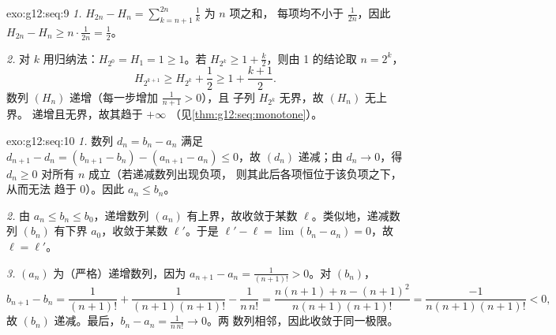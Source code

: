 \begin{solution}{exo:g12:seq:9}
\emph{1.} $H_{2n} - H_n = \sum_{k=n+1}^{2n} \frac{1}{k}$ 为 $n$ 项之和，
每项均不小于 $\frac{1}{2n}$，因此
$H_{2n} - H_n \geq n \cdot \frac{1}{2n} = \frac12$。

\emph{2.} 对 $k$ 用归纳法：$H_{2^0} = H_1 = 1 \geq 1$。若
$H_{2^k} \geq 1 + \frac{k}{2}$，则由 1 的结论取 $n = 2^k$，
\[
H_{2^{k+1}} \geq H_{2^k} + \frac12 \geq 1 + \frac{k+1}{2}.
\]
数列 $(H_n)$ 递增（每一步增加 $\frac{1}{n+1} > 0$），且
子列 $H_{2^k}$ 无界，故 $(H_n)$ 无上界。
递增且无界，故其趋于 $+\infty$
（见\cref{thm:g12:seq:monotone}）。
\end{solution}

\begin{solution}{exo:g12:seq:10}
\emph{1.} 数列 $d_n = b_n - a_n$ 满足
$d_{n+1} - d_n = (b_{n+1} - b_n) - (a_{n+1} - a_n) \leq 0$，故 $(d_n)$
递减；由 $d_n \to 0$，得 $d_n \geq 0$ 对所有 $n$ 成立（若递减数列出现负项，
则其此后各项恒位于该负项之下，从而无法
趋于 $0$）。因此 $a_n \leq b_n$。

\emph{2.} 由 $a_n \leq b_n \leq b_0$，递增数列 $(a_n)$
有上界，故收敛于某数 $\ell$。类似地，递减数列 $(b_n)$
有下界 $a_0$，收敛于某数 $\ell'$。于是
$\ell' - \ell = \lim (b_n - a_n) = 0$，故 $\ell = \ell'$。

\emph{3.} $(a_n)$ 为（严格）递增数列，因为
$a_{n+1} - a_n = \frac{1}{(n+1)!} > 0$。对 $(b_n)$，
\[
b_{n+1} - b_n = \frac{1}{(n+1)!} + \frac{1}{(n+1)(n+1)!} - \frac{1}{n\,n!}
= \frac{n(n+1) + n - (n+1)^2}{n(n+1)(n+1)!}
= \frac{-1}{n(n+1)(n+1)!} < 0 ,
\]
故 $(b_n)$ 递减。最后，$b_n - a_n = \frac{1}{n\,n!} \to 0$。两
数列相邻，因此收敛于同一极限。
\end{solution}

